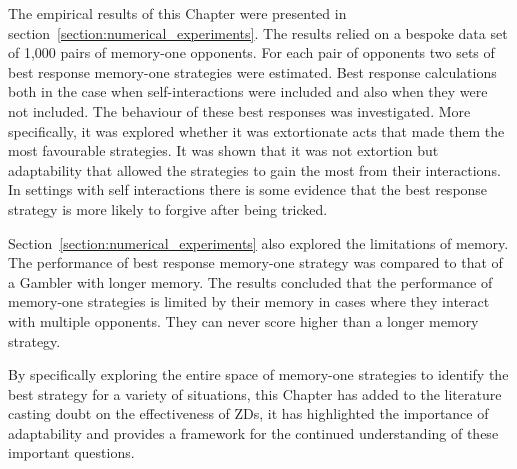 The empirical results of this Chapter were presented in
section~\ref{section:numerical_experiments}. The results relied on a bespoke
data set of 1,000 pairs of memory-one opponents. For each pair of opponents two
sets of best response memory-one strategies were estimated. Best response
calculations both in the case when self-interactions were included
and also when they were not included. The behaviour of these best responses was
investigated. More specifically, it was explored whether it was extortionate
acts that made them the most favourable strategies. It was shown that it was not
extortion but adaptability that allowed the strategies to gain the most from
their interactions. In settings with self interactions there is some evidence
that the best response strategy is more likely to forgive after being tricked.

Section~\ref{section:numerical_experiments} also explored the limitations of
memory. The performance of best response memory-one strategy was compared to
that of a Gambler with longer memory. The results concluded that the
performance of memory-one strategies is limited by their memory in cases where
they interact with multiple opponents. They can never score higher than a
longer memory strategy.

By specifically exploring the entire space of memory-one strategies to identify
the best strategy for a variety of situations, this Chapter has added to the
literature casting doubt on the effectiveness of ZDs, it has highlighted the
importance of adaptability and provides a framework for the continued
understanding of these important questions.
